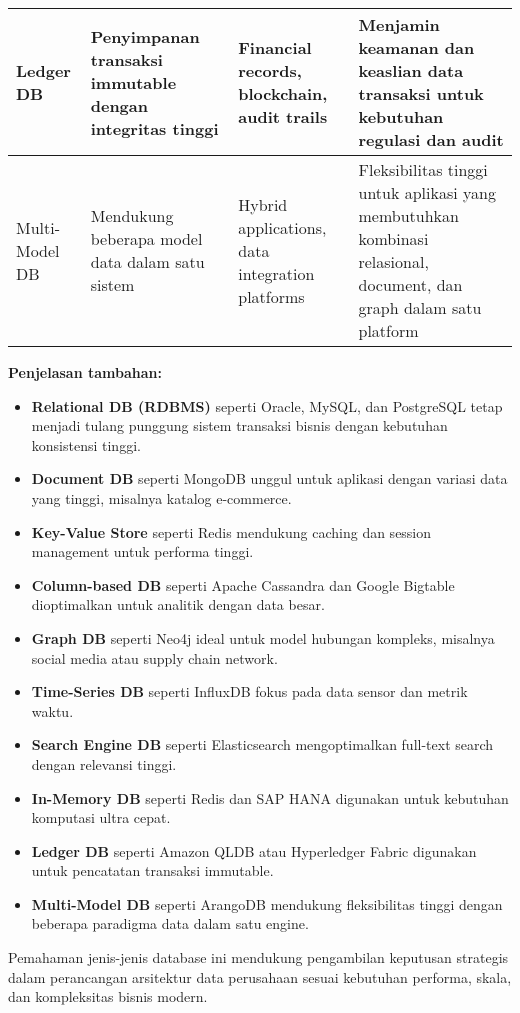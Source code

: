 \begin{longtable}{|p{}|p{}|p{}|p{}|}
	Ledger DB & Penyimpanan transaksi immutable dengan integritas tinggi & Financial records, blockchain, audit trails & Menjamin keamanan dan keaslian data transaksi untuk kebutuhan regulasi dan audit \\
	\hline
	
	Multi-Model DB & Mendukung beberapa model data dalam satu sistem & Hybrid applications, data integration platforms & Fleksibilitas tinggi untuk aplikasi yang membutuhkan kombinasi relasional, document, dan graph dalam satu platform \\
	\hline
	
\end{longtable}

\textbf{Penjelasan tambahan:}

\begin{itemize}
	\item \textbf{Relational DB (RDBMS)} seperti Oracle, MySQL, dan PostgreSQL tetap menjadi tulang punggung sistem transaksi bisnis dengan kebutuhan konsistensi tinggi.
	\item \textbf{Document DB} seperti MongoDB unggul untuk aplikasi dengan variasi data yang tinggi, misalnya katalog e-commerce.
	\item \textbf{Key-Value Store} seperti Redis mendukung caching dan session management untuk performa tinggi.
	\item \textbf{Column-based DB} seperti Apache Cassandra dan Google Bigtable dioptimalkan untuk analitik dengan data besar.
	\item \textbf{Graph DB} seperti Neo4j ideal untuk model hubungan kompleks, misalnya social media atau supply chain network.
	\item \textbf{Time-Series DB} seperti InfluxDB fokus pada data sensor dan metrik waktu.
	\item \textbf{Search Engine DB} seperti Elasticsearch mengoptimalkan full-text search dengan relevansi tinggi.
	\item \textbf{In-Memory DB} seperti Redis dan SAP HANA digunakan untuk kebutuhan komputasi ultra cepat.
	\item \textbf{Ledger DB} seperti Amazon QLDB atau Hyperledger Fabric digunakan untuk pencatatan transaksi immutable.
	\item \textbf{Multi-Model DB} seperti ArangoDB mendukung fleksibilitas tinggi dengan beberapa paradigma data dalam satu engine.
\end{itemize}

Pemahaman jenis-jenis database ini mendukung pengambilan keputusan strategis dalam perancangan arsitektur data perusahaan sesuai kebutuhan performa, skala, dan kompleksitas bisnis modern.



